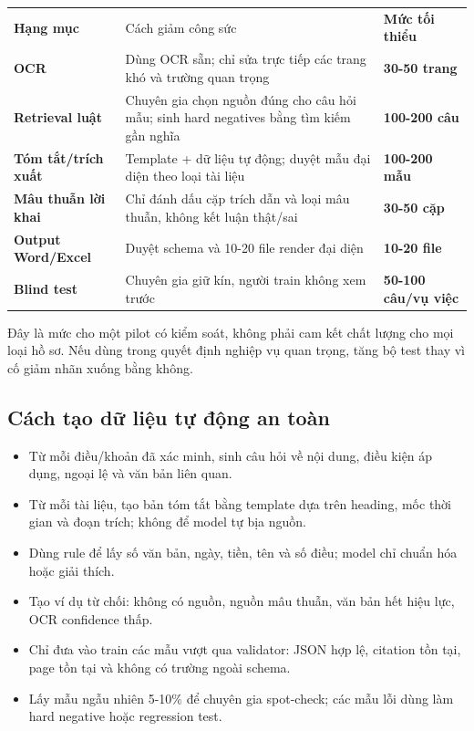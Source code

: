 \documentclass[11pt,a4paper]{article}
\begin{document}
\begin{tabularx}{\linewidth}{@{}>{\bfseries}p{4.0cm}X>{\bfseries}p{2.2cm}@{}}
Hạng mục & Cách giảm công sức & Mức tối thiểu\\
OCR & Dùng OCR sẵn; chỉ sửa trực tiếp các trang khó và trường quan trọng & 30-50 trang\\
Retrieval luật & Chuyên gia chọn nguồn đúng cho câu hỏi mẫu; sinh hard negatives bằng tìm kiếm gần nghĩa & 100-200 câu\\
Tóm tắt/trích xuất & Template + dữ liệu tự động; duyệt mẫu đại diện theo loại tài liệu & 100-200 mẫu\\
Mâu thuẫn lời khai & Chỉ đánh dấu cặp trích dẫn và loại mâu thuẫn, không kết luận thật/sai & 30-50 cặp\\
Output Word/Excel & Duyệt schema và 10-20 file render đại diện & 10-20 file\\
Blind test & Chuyên gia giữ kín, người train không xem trước & 50-100 câu/vụ việc
\end{tabularx}

Đây là mức cho một pilot có kiểm soát, không phải cam kết chất lượng cho mọi loại hồ sơ. Nếu dùng trong quyết định nghiệp vụ quan trọng, tăng bộ test thay vì cố giảm nhãn xuống bằng không.

\subsection{Cách tạo dữ liệu tự động an toàn}

\begin{itemize}
  \item Từ mỗi điều/khoản đã xác minh, sinh câu hỏi về nội dung, điều kiện áp dụng, ngoại lệ và văn bản liên quan.
  \item Từ mỗi tài liệu, tạo bản tóm tắt bằng template dựa trên heading, mốc thời gian và đoạn trích; không để model tự bịa nguồn.
  \item Dùng rule để lấy số văn bản, ngày, tiền, tên và số điều; model chỉ chuẩn hóa hoặc giải thích.
  \item Tạo ví dụ từ chối: không có nguồn, nguồn mâu thuẫn, văn bản hết hiệu lực, OCR confidence thấp.
  \item Chỉ đưa vào train các mẫu vượt qua validator: JSON hợp lệ, citation tồn tại, page tồn tại và không có trường ngoài schema.
  \item Lấy mẫu ngẫu nhiên 5-10\% để chuyên gia spot-check; các mẫu lỗi dùng làm hard negative hoặc regression test.
\end{itemize}
\end{document}
